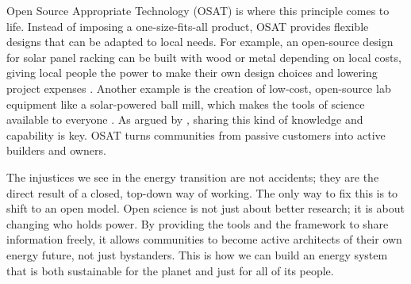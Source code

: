\documentclass[12pt, letterpaper]{article}
\begin{document}
Open Source Appropriate Technology (OSAT) is where this principle comes to life. Instead of imposing a one-size-fits-all product, OSAT provides flexible designs that can be adapted to local needs. For example, an open-source design for solar panel racking can be built with wood or metal depending on local costs, giving local people the power to make their own design choices and lowering project expenses \citep{rana2023}. Another example is the creation of low-cost, open-source lab equipment like a solar-powered ball mill, which makes the tools of science available to everyone \citep{mottaghi2023}. As argued by \citet{pierce2019}, sharing this kind of knowledge and capability is key. OSAT turns communities from passive customers into active builders and owners.

The injustices we see in the energy transition are not accidents; they are the direct result of a closed, top-down way of working. The only way to fix this is to shift to an open model. Open science is not just about better research; it is about changing who holds power. By providing the tools and the framework to share information freely, it allows communities to become active architects of their own energy future, not just bystanders. This is how we can build an energy system that is both sustainable for the planet and just for all of its people.



\end{document}
